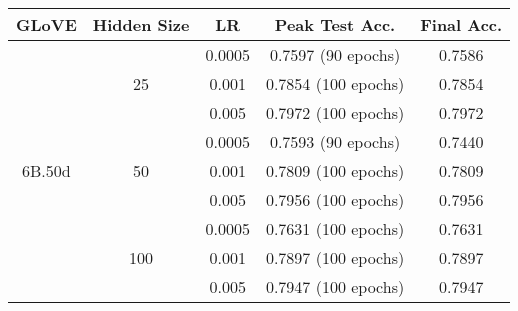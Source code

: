 \begin{table}[]
\begin{tabular}{@{}|c|c|c|c|c|@{}}
\toprule
\textbf{GLoVE}            & \textbf{Hidden Size} & \textbf{LR} & \textbf{Peak Test Acc.} & \textbf{Final Acc.} \\ \midrule
\multirow{9}{*}{6B.50d}   & \multirow{3}{*}{25}  & 0.0005      & 0.7597 (90 epochs)      & 0.7586              \\ \cmidrule(l){3-5} 
                          &                      & 0.001       & 0.7854 (100 epochs)     & 0.7854              \\ \cmidrule(l){3-5} 
                          &                      & 0.005       & 0.7972 (100 epochs)     & 0.7972              \\ \cmidrule(l){2-5} 
                          & \multirow{3}{*}{50}  & 0.0005      & 0.7593 (90 epochs)      & 0.7440              \\ \cmidrule(l){3-5} 
                          &                      & 0.001       & 0.7809 (100 epochs)     & 0.7809              \\ \cmidrule(l){3-5} 
                          &                      & 0.005       & 0.7956 (100 epochs)     & 0.7956              \\ \cmidrule(l){2-5} 
                          & \multirow{3}{*}{100} & 0.0005      & 0.7631 (100 epochs)     & 0.7631              \\ \cmidrule(l){3-5} 
                          &                      & 0.001       & 0.7897 (100 epochs)     & 0.7897              \\ \cmidrule(l){3-5} 
                          &                      & 0.005       & 0.7947 (100 epochs)      & 0.7947              \\ \bottomrule
\end{tabular}
\end{table}